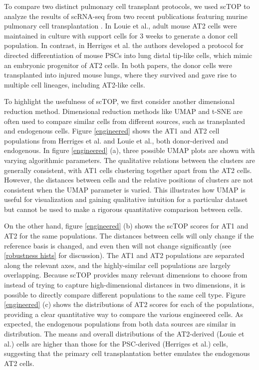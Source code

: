 \documentclass[aps,superscriptaddress, notitlepage,longbibliography]{revtex4-1}
\begin{document}
To compare two distinct pulmonary cell transplant protocols, we used scTOP to analyze the results of scRNA-seq from two recent publications featuring murine pulmonary cell transplantation \cite{herriges_durable_2022, louie_progenitor_2022}. In Louie et al., adult mouse AT2 cells were maintained in culture with support cells for 3 weeks to generate a donor cell population. In contrast, in Herriges et al. the authors developed a protocol for directed differentiation of mouse PSCs into lung distal tip-like cells, which mimic an embryonic progenitor of AT2 cells. In both papers, the donor cells were transplanted into injured mouse lungs, where they survived and gave rise to multiple cell lineages, including AT2-like cells.

To highlight the usefulness of scTOP, we first consider another dimensional reduction method. Dimensional reduction methods like UMAP and t-SNE are often used to compare similar cells from different sources, such as transplanted and endogenous cells. Figure \ref{engineered} shows the AT1 and AT2 cell populations from Herriges et al. and Louie et al., both donor-derived and endogenous. In figure \ref{engineered} (a), three possible UMAP plots are shown with varying algorithmic parameters. The qualitative relations between the clusters are generally consistent, with AT1 cells clustering together apart from the AT2 cells. However, the distances between cells and the relative positions of clusters are not consistent when the UMAP parameter is varied. This illustrates how UMAP is useful for visualization and gaining qualitative intuition for a particular dataset but cannot be used to make a rigorous quantitative comparison between cells.

On the other hand, figure \ref{engineered} (b) shows the scTOP scores for AT1 and AT2 for the same populations. The distances between cells will only change if the reference basis is changed, and even then will not change significantly (see \ref{robustness hists} for discussion). The AT1 and AT2 populations are separated along the relevant axes, and the highly-similar cell populations are largely overlapping. Because scTOP provides many relevant dimensions to choose from instead of trying to capture high-dimensional distances in two dimensions, it is possible to directly compare different populations to the same cell type. Figure \ref{engineered} (c) shows the distributions of AT2 scores for each of the populations, providing a clear quantitative way to compare the various engineered cells. As expected, the endogenous populations from both data sources are similar in distribution. The means and overall distributions of the AT2-derived (Louie et al.) cells are higher than those for the PSC-derived (Herriges et al.) cells, suggesting that the primary cell transplantation better emulates the endogenous AT2 cells.
\end{document}
